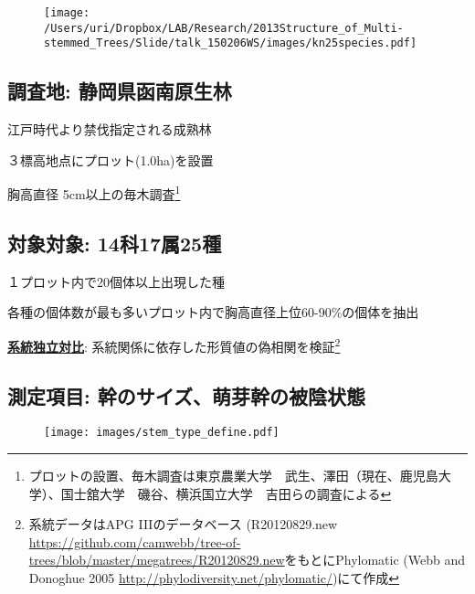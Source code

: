 \documentclass[a0, 30pt, plainboxedsections]{sciposter} %
\begin{document}
\begin{multicols}{2}

\begin{wrapfigure}{r}{16.7em}
  \texttt{[image: /Users/uri/Dropbox/LAB/Research/2013Structure\_of\_Multi-stemmed\_Trees/Slide/talk\_150206WS/images/kn25species.pdf]}
\end{wrapfigure}

\subsection*{調査地: 静岡県函南原生林}

\faCaretRight 江戸時代より禁伐指定される成熟林

\faCaretRight ３標高地点にプロット(1.0ha)を設置

\faCaretRight 胸高直径 5cm以上の毎木調査\footnote{プロットの設置、毎木調査は東京農業大学　武生、澤田（現在、鹿児島大学）、国士舘大学　磯谷、横浜国立大学　吉田らの調査による}

\subsection*{対象対象: 14科17属25種}

\faCaretRight １プロット内で20個体以上出現した種

\faCaretRight 各種の個体数が最も多いプロット内で胸高直径上位60-90\%の個体を抽出

\faCaretRight \textbf{\underline{系統独立対比}}: 系統関係に依存した形質値の偽相関を検証\footnote{系統データはAPG I\hspace{-1pt}I\hspace{-1pt}Iのデータベース (R20120829.new \url{https://github.com/camwebb/tree-of-trees/blob/master/megatrees/R20120829.new}をもとにPhylomatic (Webb and Donoghue 2005 \url{http://phylodiversity.net/phylomatic/})にて作成}

\columnbreak
\subsection*{測定項目: 幹のサイズ、萌芽幹の被陰状態}

\begin{figure}
	\texttt{[image: images/stem\_type\_define.pdf]}
\end{figure}

\vspace{-1.8em}\begin{figure}
 \begin{minipage}{0.6\hsize}

\end{minipage}
\end{figure}
\end{multicols}
\end{document}

